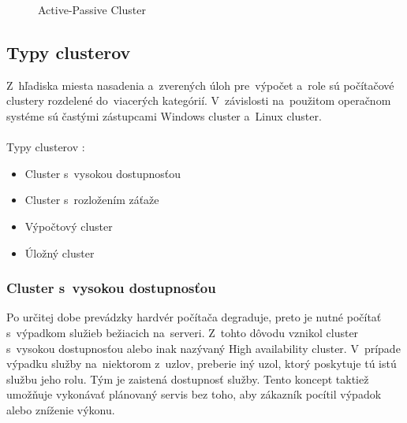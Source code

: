 \begin{figure}[H]
	\begin{center}
		\caption{Active-Passive Cluster \cite{cluster-web}}
		\label{cluster}
	\end{center}
\end{figure}

\subsection*{Typy clusterov}
Z~hľadiska miesta nasadenia a~zverených úloh pre~výpočet a~role sú počítačové clustery rozdelené do~viacerých kategórií. V~závislosti na~použitom operačnom systéme sú častými zástupcami Windows cluster a~Linux cluster.
\\\\
\noindent Typy clusterov \cite{cluster-book}:
\begin{itemize}
	\item Cluster s~vysokou dostupnosťou
	\item Cluster s~rozložením záťaže
	\item Výpočtový cluster
	\item Úložný cluster
\end{itemize}
\subsubsection*{Cluster s~vysokou dostupnosťou}
Po určitej dobe prevádzky hardvér počítača degraduje, preto je nutné počítať s~výpadkom služieb bežiacich na~serveri. Z~tohto dôvodu vznikol cluster s~vysokou dostupnosťou alebo inak nazývaný High availability cluster. V~prípade výpadku služby na~niektorom z~uzlov, preberie iný uzol, ktorý poskytuje tú istú službu jeho rolu. Tým je zaistená dostupnosť služby. Tento koncept taktiež umožňuje vykonávať plánovaný servis bez toho, aby zákazník pocítil výpadok alebo zníženie výkonu. \cite{cluster-book}

